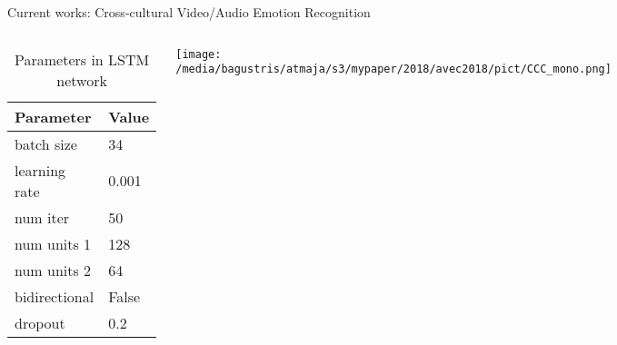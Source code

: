 \documentclass[aspectratio=169]{beamer}
\begin{document}
\begin{frame}[t, fragile]{Current works: Cross-cultural Video/Audio Emotion Recognition}
\begin{columns}
\begin{table}
  \caption{Parameters in LSTM network}
  \label{tab:lstm}
  \begin{tabular}{ll}
    \hline
    Parameter & Value \\
    \hline
    batch size    & 34       \\
    learning rate & 0.001    \\
    num iter      & 50      \\
    num units 1   & 128     \\
    num units 2   & 64      \\
    bidirectional & False    \\
    dropout       & 0.2     \\
    \hline
\end{tabular}
\end{table}
\texttt{[image: /media/bagustris/atmaja/s3/mypaper/2018/avec2018/pict/CCC\_mono.png]}
\end{columns}
\end{frame}
\end{document}
